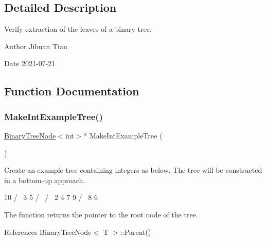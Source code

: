 \subsection{Detailed Description}
Verify extraction of the leaves of a binary tree. 

\begin{DoxyAuthor}{Author}
Jihuan Tian 
\end{DoxyAuthor}
\begin{DoxyDate}{Date}
2021-\/07-\/21 
\end{DoxyDate}


\subsection{Function Documentation}
\mbox{\label{binary-tree-get-leaves_8cc_ac883754e3b5ec7169c6d767f15641276}} 
\subsubsection{\texorpdfstring{Make\+Int\+Example\+Tree()}{MakeIntExampleTree()}}
{\footnotesize\ttfamily \hyperlink{classBinaryTreeNode}{Binary\+Tree\+Node}$<$int$>$$\ast$ Make\+Int\+Example\+Tree (\begin{DoxyParamCaption}{ }\end{DoxyParamCaption})}

Create an example tree containing integers as below. The tree will be constructed in a bottom-\/up approach. \begin{DoxyVerb}     10
    /  \
  3      5
 / \    / \
2   4  7   9
   / \
  8   6
\end{DoxyVerb}


The function returns the pointer to the root node of the tree. 

References Binary\+Tree\+Node$<$ T $>$\+::\+Parent().

